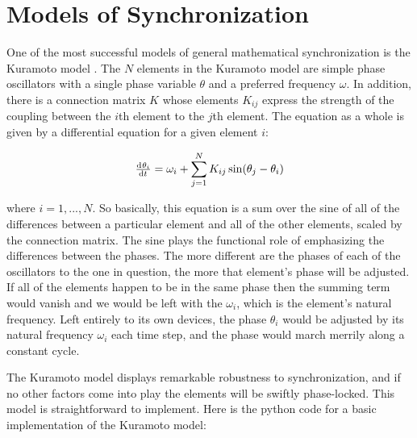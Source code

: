 \documentclass[12pt]{article}
\begin{document}
\section{Models of Synchronization}

One of the most successful models of general mathematical synchronization is the Kuramoto model \cite{Acebrón} \cite{Ermentrout}.  The $N$ elements in the Kuramoto model are simple phase oscillators with a single phase variable $\theta$ and a preferred frequency $\omega$.  In addition, there is a connection matrix $K$ whose elements $K_{ij}$ express the strength of the coupling between the $i$th element to the $j$th element.  The equation as a whole is given by a differential equation for a given element $i$:

$$ \od{\theta_i}{t}=\omega_i+\sum\limits_{j=1}^N K_{ij}\sin(\theta_j-\theta_i)$$

where $i=1,...,N$.  So basically, this equation is a sum over the sine of all of the differences between a particular element and all of the other elements, scaled by the connection matrix.  The sine plays the functional role of emphasizing the differences between the phases.  The more different are the phases of each of the oscillators to the one in question, the more that element's phase will be adjusted.  If all of the elements happen to be in the same phase then the summing term would vanish and we would be left with the $\omega_i$, which is the element's natural frequency.  Left entirely to its own devices, the phase $\theta_i$ would be adjusted by its natural frequency $\omega_i$ each time step, and the phase would march merrily along a constant cycle.  

The Kuramoto model displays remarkable robustness to synchronization, and if no other factors come into play the elements will be swiftly phase-locked.  This model is straightforward to implement.  Here is the python code for a basic implementation of the Kuramoto model:
\end{document}
